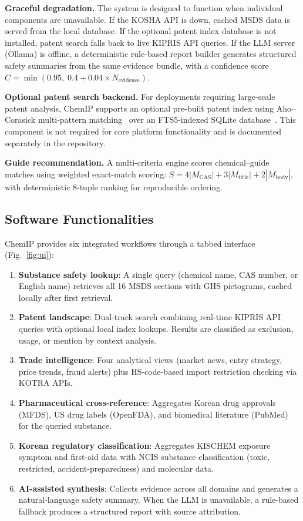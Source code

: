 \documentclass[preprint,12pt]{elsarticle}
\begin{document}
\textbf{Graceful degradation.} The system is designed to function when individual components are unavailable. If the KOSHA API is down, cached MSDS data is served from the local database. If the optional patent index database is not installed, patent search falls back to live KIPRIS API queries. If the LLM server (Ollama) is offline, a deterministic rule-based report builder generates structured safety summaries from the same evidence bundle, with a confidence score $C = \min(0.95,\; 0.4 + 0.04 \times N_{\text{evidence}})$.

\textbf{Optional patent search backend.} For deployments requiring large-scale patent analysis, ChemIP supports an optional pre-built patent index using Aho--Corasick multi-pattern matching~\cite{aho1975} over an FTS5-indexed SQLite database~\cite{sqlite2024}. This component is not required for core platform functionality and is documented separately in the repository.

\textbf{Guide recommendation.} A multi-criteria engine scores chemical--guide matches using weighted exact-match scoring: $S = 4|M_{\text{CAS}}| + 3|M_{\text{title}}| + 2|M_{\text{body}}|$, with deterministic 8-tuple ranking for reproducible ordering.

\subsection{Software Functionalities}

ChemIP provides six integrated workflows through a tabbed interface (Fig.~\ref{fig:ui}):

\begin{enumerate}
\item \textbf{Substance safety lookup}: A single query (chemical name, CAS number, or English name) retrieves all 16 MSDS sections with GHS pictograms, cached locally after first retrieval.
\item \textbf{Patent landscape}: Dual-track search combining real-time KIPRIS API queries with optional local index lookups. Results are classified as exclusion, usage, or mention by context analysis.
\item \textbf{Trade intelligence}: Four analytical views (market news, entry strategy, price trends, fraud alerts) plus HS-code-based import restriction checking via KOTRA APIs.
\item \textbf{Pharmaceutical cross-reference}: Aggregates Korean drug approvals (MFDS), US drug labels (OpenFDA), and biomedical literature (PubMed) for the queried substance.
\item \textbf{Korean regulatory classification}: Aggregates KISCHEM exposure symptom and first-aid data with NCIS substance classification (toxic, restricted, accident-preparedness) and molecular data.
\item \textbf{AI-assisted synthesis}: Collects evidence across all domains and generates a natural-language safety summary. When the LLM is unavailable, a rule-based fallback produces a structured report with source attribution.
\end{enumerate}
\end{document}
